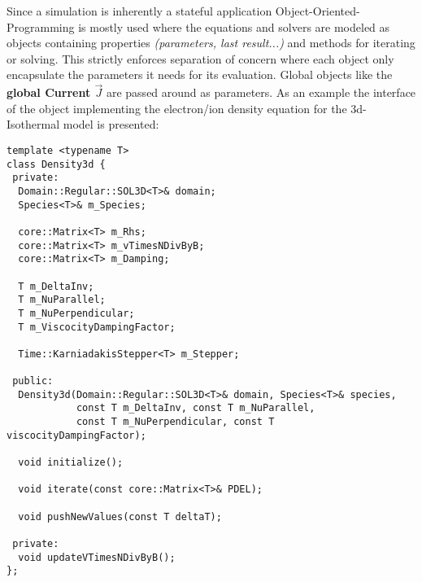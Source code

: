 Since a simulation is inherently a stateful application Object-Oriented-Programming is mostly used where the equations and solvers are modeled as objects containing properties \textit{(parameters, last result...)} and methods for iterating or solving. This strictly enforces separation of concern where each object only encapsulate the parameters it needs for its evaluation. Global objects like the \textbf{global Current $\vec{J}$} are passed around as parameters.\newline
As an example the interface of the object implementing the electron/ion density equation for the 3d-Isothermal model is presented:

\begin{lstlisting}
template <typename T>
class Density3d {
 private:
  Domain::Regular::SOL3D<T>& domain;
  Species<T>& m_Species;

  core::Matrix<T> m_Rhs;
  core::Matrix<T> m_vTimesNDivByB;
  core::Matrix<T> m_Damping;

  T m_DeltaInv;
  T m_NuParallel;
  T m_NuPerpendicular;
  T m_ViscocityDampingFactor;

  Time::KarniadakisStepper<T> m_Stepper;

 public:
  Density3d(Domain::Regular::SOL3D<T>& domain, Species<T>& species,
            const T m_DeltaInv, const T m_NuParallel,
            const T m_NuPerpendicular, const T viscocityDampingFactor);

  void initialize();

  void iterate(const core::Matrix<T>& PDEL);

  void pushNewValues(const T deltaT);

 private:
  void updateVTimesNDivByB();
};
\end{lstlisting}


